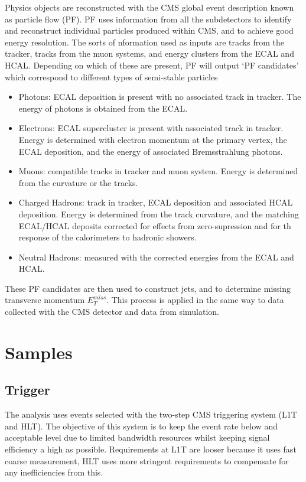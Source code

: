 Physics objects are reconstructed with the CMS global event description known as particle flow (PF). 
PF uses information from all the subdetectors to identify and reconstruct individual particles produced within CMS, and to achieve good energy resolution.
The sorts of nformation used as inputs are tracks from the tracker, tracks from the muon systems, and energy clusters from the ECAL and HCAL. Depending on which of these are present, PF will output `PF candidates' which correspond to different types of semi-stable particles 
\begin{itemize}[leftmargin=.5in,noitemsep]
    \item Photons: ECAL deposition is present with no associated track in tracker. The energy of photons is obtained from the ECAL. 
    \item Electrons: ECAL supercluster is present with associated track in tracker. Energy is determined with electron momentum at the primary vertex, the ECAL deposition, and the energy of associated Bremsstrahlung photons. 
    \item Muons: compatible tracks in tracker and muon system. Energy is determined from the curvature or the tracks. 
    \item Charged Hadrons: track in tracker, ECAL deposition and associated HCAL deposition. Energy is determined from the track curvature, and the matching ECAL/HCAL deposits corrected for effects from zero-supression and for th response of the calorimeters to hadronic showers.
    \item Neutral Hadrons: measured with the corrected energies from the ECAL and HCAL. 
\end{itemize}
These PF candidates are then used to construct jets, and to determine missing transverse momentum $E_{T}^{miss}$.
This process is applied in the same way to data collected with the CMS detector and data from simulation.


\section{Samples}

\subsection{Trigger}
The analysis uses events selected with the two-step CMS triggering system (L1T and HLT). The objective of this system is to keep the event rate below and acceptable level due to limited bandwidth resources whilst keeping signal efficiency a high as possible. Requirements at L1T are looser because it uses fast coarse measurement, HLT uses more stringent requirements to compensate for any inefficiencies from this. 

